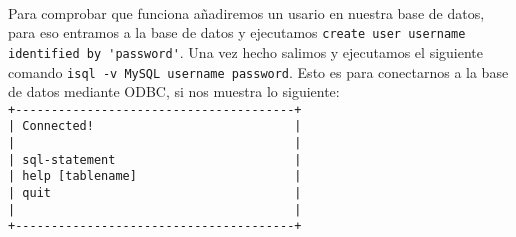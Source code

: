 \documentclass{article}
\begin{document}
		\paragraph{} Para comprobar que funciona añadiremos un usario en nuestra base de datos, para eso entramos a la base de datos y ejecutamos \verb+create user username identified by 'password'+. Una vez hecho salimos y ejecutamos el siguiente comando \verb+isql -v MySQL username password+. Esto es para conectarnos a la base de datos mediante ODBC, si nos muestra lo siguiente:\\
\verb/+---------------------------------------+/\\
\verb/| Connected!                            |/\\
\verb/|                                       |/\\
\verb/| sql-statement                         |/\\
\verb/| help [tablename]                      |/\\
\verb/| quit                                  |/\\
\verb/|                                       |/\\
\verb/+---------------------------------------+/\\
\end{document}
